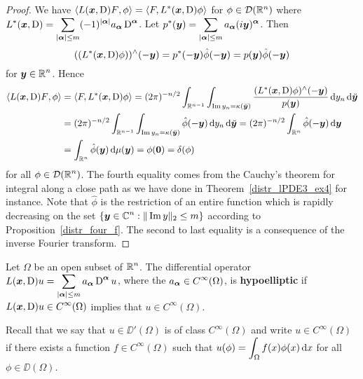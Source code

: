 \begin{proof}
 We have
$\displaystyle \left\langle{L({\bm{x}},\operatorname{D}) F} , {\phi}\right\rangle
= \left\langle{F} , {L^\ast({\bm{x}},\operatorname{D}) \phi}\right\rangle$
for $\phi \in \mathcal{D}(\mathbb{R}^n)$ where \\
$\displaystyle L^\ast({\bm{x}},\operatorname{D})
= \sum_{|{\bm{\alpha}}|\leq m} (-1)^{|{\bm{\alpha}}|} a_{{\bm{\alpha}}}
\operatorname{D}^{{\bm{\alpha}}}$.
Let $\displaystyle p^\ast({\bm{y}}) = \sum_{|{\bm{\alpha}}|\leq m}
a_{{\bm{\alpha}}} (i {\bm{y}})^{{\bm{\alpha}}}$.
Then
\[
((L^\ast({\bm{x}},\operatorname{D}) \phi))^\wedge(-{\bm{y}})
= p^\ast(-{\bm{y}}) \hat{\phi}(-{\bm{y}})
= p({\bm{y}}) \hat{\phi}(-{\bm{y}})
\]
for $\displaystyle {\bm{y}}\in \mathbb{R}^n$.  Hence
\begin{align*}
\left\langle{L({\bm{x}},\operatorname{D})F} , {\phi}\right\rangle &= \left\langle{F} , {L^\ast({\bm{x}},\operatorname{D})\phi}\right\rangle
= (2\pi)^{-n/2} \int_{\mathbb{R}^{n-1}} \int_{\operatorname{Im} y_n = \kappa(\breve{{\bm{y}}})}
\frac{(L^\ast({\bm{x}},\operatorname{D})\phi)^\wedge(-{\bm{y}})}{p({\bm{y}})}
\,\mathrm{d}{y_n}\,\mathrm{d}{\breve{{\bm{y}}}} \\
&= (2\pi)^{-n/2} \int_{\mathbb{R}^{n-1}} \int_{\operatorname{Im} y_n = \kappa(\breve{{\bm{y}}})}
\hat{\phi}(-{\bm{y}}) \,\mathrm{d}{y_n}\,\mathrm{d}{\breve{{\bm{y}}}}
= (2\pi)^{-n/2} \int_{\mathbb{R}^n} \hat{\phi}(-{\bm{y}}) \,\mathrm{d}{{\bm{y}}} \\
&= \int_{\mathbb{R}^n} \hat{\phi}({\bm{y}}) \,\mathrm{d}{\mu({\bm{y}})}
= \phi({\bm{0}}) = \delta(\phi)
\end{align*}
for all $\displaystyle \phi \in \mathcal{D}(\mathbb{R}^n)$.  The fourth equality comes from
the Cauchy's theorem for integral along a close path as we have done 
in Theorem~\ref{distr_lPDE3_ex4} for instance.
Note that $\hat{\phi}$ is the restriction of an entire function which
is rapidly decreasing on the set
$\displaystyle \{ {\bm{y}} \in \mathbb{C}^n : \|\operatorname{Im} y\|_2 \leq m \}$ according to 
Proposition~\ref{distr_four_f}.  The second to last
equality is a consequence of the inverse Fourier transform.
\end{proof}

\begin{defn}
Let $\Omega$ be an open subset of $\displaystyle \mathbb{R}^n$.  The
differential operator
$\displaystyle L({\bm{x}},\operatorname{D})u = \sum_{|{\bm{\alpha}}|\leq m}
a_{{\bm{\alpha}}} \operatorname{D}^{{\bm{\alpha}}} u$,
where the $\displaystyle a_{{\bm{\alpha}}}\in C^\infty(\Omega)$, is
{\bfseries hypoelliptic}%
 if
$\displaystyle L({\bm{x}},\operatorname{D})u \in C^\infty(\Omega)$ implies that
$\displaystyle u \in C^\infty(\Omega)$.
\end{defn}

Recall that we say that $u \in \DD'(\Omega)$ is of class
$\displaystyle C^\infty(\Omega)$ and write
$\displaystyle u \in C^\infty(\Omega)$ if there exists
a function $\displaystyle f \in C^\infty(\Omega)$ such that
$\displaystyle u(\phi) = \int_{\Omega} f(x) \phi(x) \,\mathrm{d}{x}$
for all $\phi \in \DD(\Omega)$.

